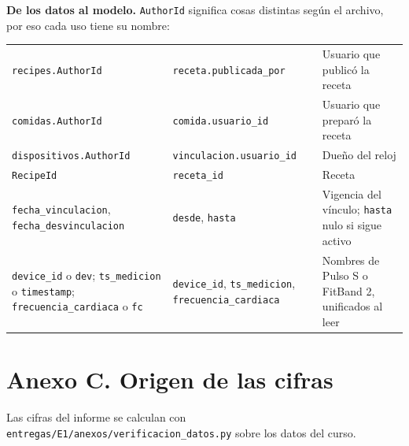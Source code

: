 \documentclass[11pt]{article}
\begin{document}
\textbf{De los datos al modelo.} \texttt{AuthorId} significa cosas distintas
según el archivo, por eso cada uso tiene su nombre:

\begingroup\iniciartabla\footnotesize
\begin{tabularx}{\textwidth}{|L{5.2cm}|L{3.6cm}|Y|}\hline
{} &  & \\\hline
\texttt{recipes.AuthorId} & \texttt{receta.publicada\_por} & Usuario que publicó la receta\\\hline
\texttt{comidas.AuthorId} & \texttt{comida.usuario\_id} & Usuario que preparó la receta\\\hline
\texttt{dispositivos.AuthorId} & \texttt{vinculacion.usuario\_id} & Dueño del reloj\\\hline
\texttt{RecipeId} & \texttt{receta\_id} & Receta\\\hline
\texttt{fecha\_vinculacion}, \texttt{fecha\_desvinculacion} & \texttt{desde}, \texttt{hasta} & Vigencia del vínculo; \texttt{hasta} nulo si sigue activo\\\hline
\texttt{device\_id} o \texttt{dev}; \texttt{ts\_medicion} o \texttt{timestamp}; \texttt{frecuencia\_cardiaca} o \texttt{fc} & \texttt{device\_id}, \texttt{ts\_medicion}, \texttt{frecuencia\_cardiaca} & Nombres de Pulso S o FitBand 2, unificados al leer\\\hline
\end{tabularx}
\endgroup

\section{Anexo C. Origen de las cifras}



Las cifras del informe se calculan con
\texttt{entregas/E1/anexos/verificacion\_datos.py} sobre los datos del curso.
\end{document}
